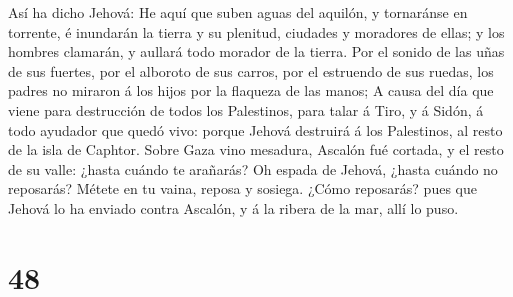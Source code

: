  Así ha dicho Jehová: He aquí que suben aguas del aquilón, y
tornaránse en torrente, é inundarán la tierra y su plenitud, ciudades y
moradores de ellas; y los hombres clamarán, y aullará todo morador de la
tierra.  Por el sonido de las uñas de sus fuertes, por el
alboroto de sus carros, por el estruendo de sus ruedas, los padres no
miraron á los hijos por la flaqueza de las manos;  A causa
del día que viene para destrucción de todos los Palestinos, para talar á
Tiro, y á Sidón, á todo ayudador que quedó vivo: porque Jehová destruirá
á los Palestinos, al resto de la isla de Caphtor.  Sobre
Gaza vino mesadura, Ascalón fué cortada, y el resto de su valle: ¿hasta
cuándo te arañarás?  Oh espada de Jehová, ¿hasta cuándo no
reposarás? Métete en tu vaina, reposa y sosiega.  ¿Cómo
reposarás? pues que Jehová lo ha enviado contra Ascalón, y á la ribera
de la mar, allí lo puso.

\hypertarget{section-47}{%
\section{48}\label{section-47}}

